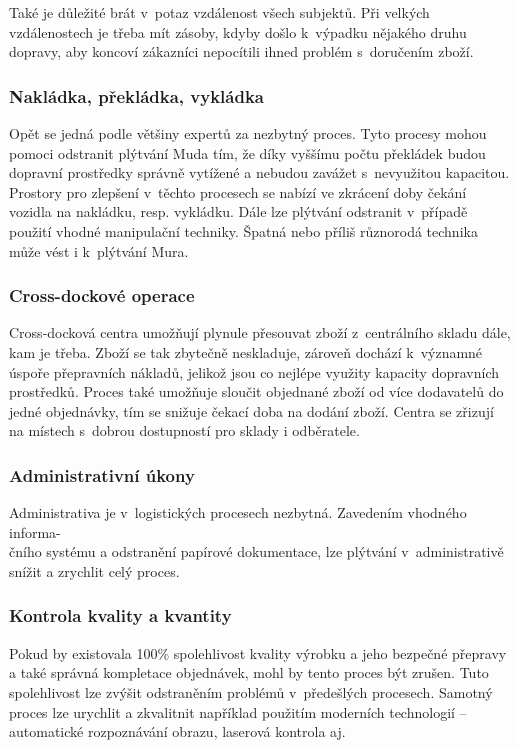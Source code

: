 Také je důležité brát v~potaz vzdálenost všech subjektů. Při velkých vzdálenostech je třeba mít zásoby, kdyby došlo k~výpadku nějakého druhu dopravy, aby koncoví zákazníci nepocítili ihned problém s~doručením zboží.

\subsubsection*{Nakládka, překládka, vykládka}

Opět se jedná podle většiny expertů za nezbytný proces. Tyto procesy mohou pomoci odstranit plýtvání Muda tím, že díky vyššímu počtu překládek budou dopravní prostředky správně vytížené a nebudou zavážet s~nevyužitou kapacitou. Prostory pro zlepšení v~těchto procesech se nabízí ve zkrácení doby čekání vozidla na nakládku, resp. vykládku. Dále lze plýtvání odstranit v~případě použití vhodné manipulační techniky. Špatná nebo příliš různorodá technika může vést i k~plýtvání Mura.

\subsubsection*{Cross-dockové operace}

Cross-docková centra umožňují plynule přesouvat zboží z~centrálního skladu dále, kam je třeba. Zboží se tak zbytečně neskladuje, zároveň dochází k~významné úspoře přepravních nákladů, jelikož jsou co nejlépe využity kapacity dopravních prostředků. Proces také umožňuje sloučit objednané zboží od více dodavatelů do jedné objednávky, tím se snižuje čekací doba na dodání zboží. Centra se zřizují na místech s~dobrou dostupností pro sklady i odběratele.

\subsubsection*{Administrativní úkony}

Administrativa je v~logistických procesech nezbytná. Zavedením vhodného informa-\\čního systému a odstranění papírové dokumentace, lze plýtvání v~administrativě snížit a zrychlit celý proces. 

\subsubsection*{Kontrola kvality a kvantity}

Pokud by existovala 100\% spolehlivost kvality výrobku a jeho bezpečné přepravy a také správná kompletace objednávek, mohl by tento proces být zrušen. Tuto spolehlivost lze zvýšit odstraněním problémů v~předešlých procesech. Samotný proces lze urychlit a zkvalitnit například použitím moderních technologií -- automatické rozpoznávání obrazu, laserová kontrola aj.

